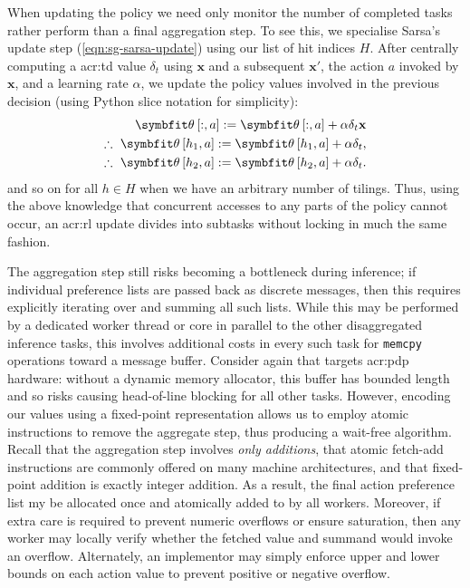 When updating the policy we need only monitor the number of completed tasks rather perform than a final aggregation step.
To see this, we specialise Sarsa's update step (\cref{eqn:sg-sarsa-update}) using our list of hit indices $H$.
After centrally computing a \gls{acr:td} value $\delta_t$ using $\mathbf{x}$ and a subsequent $\mathbf{x}'$, the action $a$ invoked by $\mathbf{x}$, and a learning rate $\alpha$, we update the policy values involved in the previous decision (using Python slice notation for simplicity):
\begin{align*}
\wvec{}\left[:,a\right] := \wvec{}\left[:,a\right] + \alpha\delta_t \mathbf{x}\\
\therefore~\wvec{}\left[h_1,a\right] := \wvec{}\left[h_1,a\right] + \alpha\delta_t,\\
\therefore~\wvec{}\left[h_2,a\right] := \wvec{}\left[h_2,a\right] + \alpha\delta_t.
\end{align*}
and so on for all $h \in H$ when we have an arbitrary number of tilings.
Thus, using the above knowledge that concurrent accesses to any parts of the policy cannot occur, an \gls{acr:rl} update divides into subtasks without locking in much the same fashion. 

The aggregation step still risks becoming a bottleneck during inference; if individual preference lists are passed back as discrete messages, then this requires explicitly iterating over and summing all such lists.
While this may be performed by a dedicated worker thread or core in parallel to the other disaggregated inference tasks, this involves additional costs in every such task for \texttt{memcpy} operations toward a message buffer.
Consider again that \approachshort{} targets \gls{acr:pdp} hardware: without a dynamic memory allocator, this buffer has bounded length and so risks causing head-of-line blocking for all other tasks.
However, encoding our values using a fixed-point representation allows us to employ atomic instructions to remove the aggregate step, thus producing a wait-free algorithm.
Recall that the aggregation step involves \emph{only additions}, that atomic fetch-add instructions are commonly offered on many machine architectures, and that fixed-point addition is exactly integer addition.
As a result, the final action preference list my be allocated once and atomically added to by all workers.
Moreover, if extra care is required to prevent numeric overflows or ensure saturation, then any worker may locally verify whether the fetched value and summand would invoke an overflow.
Alternately, an implementor may simply enforce upper and lower bounds on each action value to prevent positive or negative overflow.

